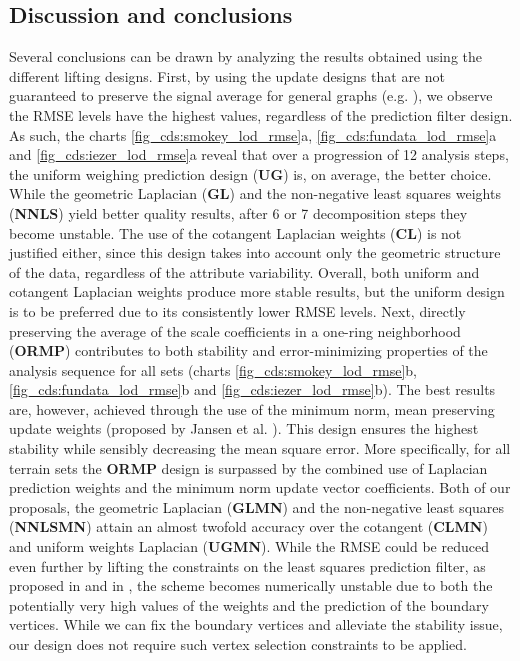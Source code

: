 \documentclass[graybox]{svmult}
\begin{document}
	\subsection{Discussion and conclusions}
	Several conclusions can be drawn by analyzing the results obtained using the different lifting designs. First, by using the update designs that are not guaranteed to preserve the signal average for general graphs (e.g. \cite{ Martinez2011}), we observe the RMSE levels have the highest values, regardless of the prediction filter design. As such, the charts \ref{fig_cds:smokey_lod_rmse}a, \ref{fig_cds:fundata_lod_rmse}a and \ref{fig_cds:iezer_lod_rmse}a reveal that over a progression of 12 analysis steps, the uniform weighing prediction design (\textbf{UG}) is, on average, the better choice. While the geometric Laplacian (\textbf{GL}) and the non-negative least squares weights (\textbf{NNLS}) yield better quality results, after  6 or 7 decomposition steps they become unstable. The use of the cotangent Laplacian weights (\textbf{CL}) is not justified either, since this design takes into account only the geometric structure of the data, regardless of the attribute variability. Overall, both uniform and cotangent Laplacian weights produce more stable results, but the uniform design is to be preferred due to its consistently lower RMSE levels. Next, directly preserving the average of the scale coefficients in a one-ring neighborhood (\textbf{ORMP}) contributes to both  stability and error-minimizing properties of the analysis sequence for all sets (charts \ref{fig_cds:smokey_lod_rmse}b, \ref{fig_cds:fundata_lod_rmse}b and \ref{fig_cds:iezer_lod_rmse}b). The best results are, however, achieved through the use of the minimum norm, mean preserving update weights (proposed by Jansen et al. \cite{Jansen2001}). This design ensures the highest stability while sensibly decreasing the mean square error. More specifically, for all terrain sets the \textbf{ORMP} design is surpassed by the combined use of Laplacian prediction weights and the minimum norm update vector coefficients. Both of our proposals, the geometric Laplacian (\textbf{GLMN}) and the non-negative least squares (\textbf{NNLSMN}) attain an almost twofold accuracy over the cotangent (\textbf{CLMN}) and uniform weights Laplacian (\textbf{UGMN}). While the RMSE could be reduced even further by lifting the constraints on the least squares prediction filter, as proposed in \cite{Wagner2005} and in \cite{Martinez2011}, the scheme becomes numerically unstable due to both the potentially very high values of the weights and the prediction of the boundary vertices. While we can fix the boundary vertices and alleviate the stability issue, our design does not require such vertex selection constraints to be applied.
	
\end{document}
